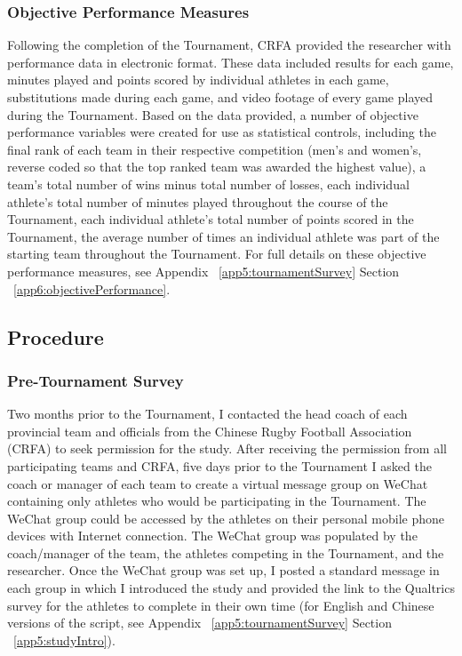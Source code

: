 \subsubsection{\label{app5:objectivePerformance}Objective Performance Measures}
Following the completion of the Tournament, CRFA provided the researcher with performance data in electronic format. These data included results for each game, minutes played and points scored by individual athletes in each game, substitutions made during each game, and video footage of every game played during the Tournament.  Based on the data provided, a number of objective performance variables were created for use as statistical controls, including the final rank of each team in their respective competition (men's and women's, reverse coded so that the top ranked team was awarded the highest value), a team's total number of wins minus total number of losses, each individual athlete's total number of minutes played throughout the course of the Tournament, each individual athlete's total number of points scored in the Tournament, the average number of times an individual athlete was part of the starting team throughout the Tournament. For full details on these objective performance measures, see Appendix ~\ref{app5:tournamentSurvey} Section ~\ref{app6:objectivePerformance}.




\subsection{Procedure}

\subsubsection{Pre-Tournament Survey}
Two months prior to the Tournament, I contacted the head coach of each provincial team and officials from the Chinese Rugby Football Association (CRFA) to seek permission for the study.  After receiving the permission from all participating teams and CRFA, five days prior to the Tournament I asked the coach or manager of each team to create a virtual message group on WeChat containing only athletes who would be participating in the Tournament. The WeChat group could be accessed by the athletes on their personal mobile phone devices with Internet connection. The WeChat group was populated by the coach/manager of the team, the athletes competing in the Tournament, and the researcher. Once the WeChat group was set up, I posted a standard message in each group in which I introduced the study and provided the link to the Qualtrics survey for the athletes to complete in their own time (for English and Chinese versions of the script, see Appendix ~\ref{app5:tournamentSurvey} Section ~\ref{app5:studyIntro}).

